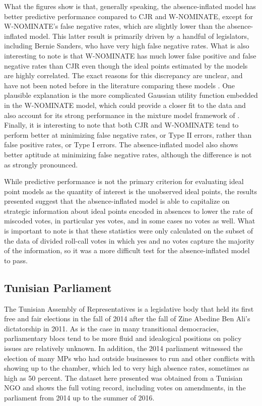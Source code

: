 What the figures show is that, generally speaking, the absence-inflated model has better predictive performance compared to CJR and W-NOMINATE, except for W-NOMINATE's false negative rates, which are slightly lower than the absence-inflated model. This latter result is primarily driven by a handful of legislators, including Bernie Sanders, who have very high false negative rates. What is also interesting to note is that W-NOMINATE has much lower false positive and false negative rates than CJR even though the ideal points estimated by the models are highly correlated. The exact reasons for this discrepancy are unclear, and have not been noted before in the literature comparing these models \parencite{carroll2009,jackman2004,carroll2013}. One plausible explanation is the more complicated Gaussian utility function embedded in the W-NOMINATE model, which could provide a closer fit to the data and also account for its strong performance in the mixture model framework of \textcite{carroll2013}. Finally, it is interesting to note that both CJR and W-NOMINATE tend to perform better at minimizing false negative rates, or Type II errors, rather than false positive rates, or Type I errors. The absence-inflated model also shows better aptitude at minimizing false negative rates, although the difference is not as strongly pronounced.

While predictive performance is not the primary criterion for evaluating ideal point models as the quantity of interest is the unobserved ideal points, the results presented suggest that the absence-inflated model is able to capitalize on strategic information about ideal points encoded in absences to lower the rate of miscoded votes, in particular yes votes, and in some cases no votes as well. What is important to note is that these statistics were only calculated on the subset of the data of divided roll-call votes in which yes and no votes capture the majority of the information, so it was a more difficult test for the absence-inflated model to pass. 




	
	\subsection{Tunisian Parliament}
	
	The Tunisian Assembly of Representatives is a legislative body that held its first free and fair elections in the fall of 2014 after the fall of Zine Abedine Ben Ali's dictatorship in 2011. As is the case in many transitional democracies, parliamentary blocs tend to be more fluid and idealogical positions on policy issues are relatively unknown. In addition, the 2014 parliament witnessed the election of many MPs who had outside businesses to run and other conflicts with showing up to the chamber, which led to very high absence rates, sometimes as high as 50 percent. The dataset here presented was obtained from a Tunisian NGO and shows the full voting record, including votes on amendments, in the parliament from 2014 up to the summer of 2016. 
	
